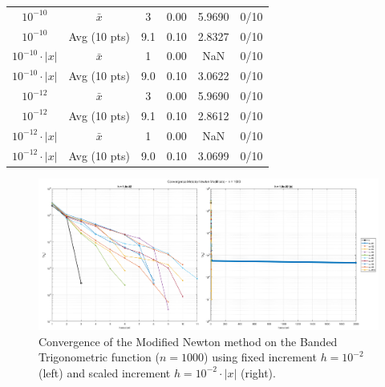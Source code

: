 \documentclass[a4paper,12pt]{article}
\begin{document}
\begin{table}[htbp]
{\begin{tabular}{|c|c|c|c|c|c|}
				\hline
				$10^{-10}$ & $\bar{x}$ & 3 & 0.00 & 5.9690 & 0/10 \\
				$10^{-10}$ & Avg (10 pts) & 9.1 & 0.10 & 2.8327 & 0/10 \\
				$10^{-10}\cdot|x|$ & $\bar{x}$ & 1 & 0.00 & NaN & 0/10 \\
				$10^{-10}\cdot|x|$ & Avg (10 pts) & 9.0 & 0.10 & 3.0622 & 0/10 \\
				\hline
				$10^{-12}$ & $\bar{x}$ & 3 & 0.00 & 5.9690 & 0/10 \\
				$10^{-12}$ & Avg (10 pts) & 9.1 & 0.10 & 2.8612 & 0/10 \\
				$10^{-12}\cdot|x|$ & $\bar{x}$ & 1 & 0.00 & NaN & 0/10 \\
				$10^{-12}\cdot|x|$ & Avg (10 pts) & 9.0 & 0.10 & 3.0699 & 0/10 \\
				\hline
			\end{tabular}%
		}
		\label{tab:banded_fd_1000}
	\end{table}
	
	\newpage
	\begin{figure}[H]
		\centering
		\includegraphics[width=\textwidth]{../immagini/banded_1k_h2.png}
		\caption{Convergence of the Modified Newton method on the Banded Trigonometric function ($n=1000$) using fixed increment $h = 10^{-2}$ (left) and scaled increment $h = 10^{-2}\cdot|x|$ (right).}
		\label{fig:bt_fd_1k_h2}
	\end{figure}
	
\end{document}
